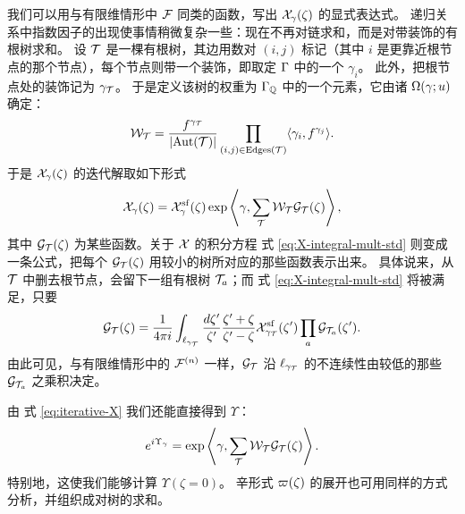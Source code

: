 我们可以用与有限维情形中 $\mathcal{F}$ 同类的函数，写出 $\mathcal{X}_\gamma(\zeta)$ 的显式表达式。
递归关系中指数因子的出现使事情稍微复杂一些：现在不再对链求和，而是对带装饰的有根树求和。
设 $\mathcal{T}$ 是一棵有根树，其边用数对 $(i,j)$ 标记（其中 $i$ 是更靠近根节点的那个节点），每个节点则带一个装饰，即取定 $\Gamma$ 中的一个 $\gamma_i$。
此外，把根节点处的装饰记为 $\gamma_{\mathcal{T}}$。
于是定义该树的权重为 $\Gamma_{\mathbb{Q}}$ 中的一个元素，它由诸 $\Omega(\gamma;u)$ 确定：
\begin{equation}
\mathcal{W}_{\mathcal{T}} = \frac{f^{\gamma_{\mathcal{T}}}}{\lvert \mathrm{Aut}(\mathcal{T}) \rvert} \prod_{(i,j) \in {\mathrm {Edges}}(\mathcal{T})} \langle \gamma_i, f^{\gamma_j} \rangle.
\end{equation}
于是 $\mathcal{X}_\gamma(\zeta)$ 的迭代解取如下形式
\begin{equation} \label{eq:iterative-X}
\mathcal{X}_\gamma(\zeta) = \mathcal{X}^{\mathrm{sf}}_\gamma (\zeta)\exp \left\langle \gamma, \sum_{\mathcal{T}}
\mathcal{W}_{\mathcal{T}} \mathcal{G}_{\mathcal{T}}(\zeta) \right\rangle,
\end{equation}
其中 $\mathcal{G}_{\mathcal{T}}(\zeta)$ 为某些函数。关于 $\mathcal{X}$ 的积分方程 式 \eqref{eq:X-integral-mult-std} 则变成一条公式，把每个 $\mathcal{G}_{\mathcal{T}}(\zeta)$ 用较小的树所对应的那些函数表示出来。
具体说来，从 $\mathcal{T}$ 中删去根节点，会留下一组有根树 $\mathcal{T}_a$；而 式 \eqref{eq:X-integral-mult-std} 将被满足，只要
\begin{equation}
\mathcal{G}_{\mathcal{T}}(\zeta) = \frac{1}{4 \pi i} \int_{\ell_{\gamma_{\mathcal{T}}}} \frac{d \zeta'}{\zeta'} \frac{\zeta' + \zeta}{\zeta' - \zeta} \mathcal{X}^{\mathrm{sf}}_{\gamma_{\mathcal{T}}}(\zeta') \prod_a \mathcal{G}_{\mathcal{T}_a}(\zeta').
\end{equation}
由此可见，与有限维情形中的 $\mathcal{F}^{(n)}$ 一样，$\mathcal{G}_{\mathcal{T}}$ 沿 $\ell_{\gamma_{\mathcal{T}}}$ 的不连续性由较低的那些 $\mathcal{G}_{\mathcal{T}_a}$ 之乘积决定。

由 式 \eqref{eq:iterative-X} 我们还能直接得到 $\Upsilon$：
\begin{equation}
e^{i \Upsilon_\gamma} = \exp \left\langle \gamma, \sum_{\mathcal{T}}
\mathcal{W}_{\mathcal{T}} \mathcal{G}_{\mathcal{T}}(\zeta) \right\rangle.
\end{equation}
特别地，这使我们能够计算 $\Upsilon(\zeta = 0)$。
辛形式 $\varpi(\zeta)$ 的展开也可用同样的方式分析，并组织成对树的求和。
